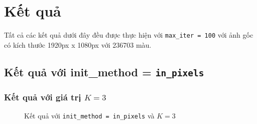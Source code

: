 \section{Kết quả}
Tất cả các kết quả dưới đây đều được thực hiện với \texttt{max\_iter = 100} với ảnh gốc có kích thước 1920px x 1080px với 236703 màu.
\subsection{Kết quả với init\_method = \texttt{in\_pixels}}

\subsubsection{Kết quả với giá trị $K = 3$}

\begin{figure}[H]
	\centering
	\qquad
	\caption{Kết quả với \texttt{init\_method = in\_pixels} và $K = 3$}%
\end{figure}


